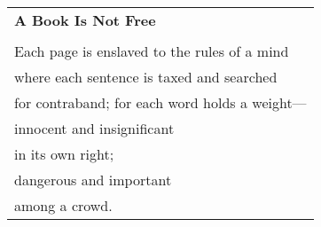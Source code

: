 \documentclass{article}
\begin{document}
\begin{center}
\begin{tabular}{l}
\textbf{A Book Is Not Free} \\
\\
Each page is enslaved to the rules of a mind \\
where each sentence is taxed and searched \\
for contraband; for each word holds a weight--- \\
\hspace{4ex}innocent and insignificant \\
in its own right; \\
\hspace{4ex}dangerous and important \\
among a crowd. \\
\end{tabular}
\end{center}
\end{document}
